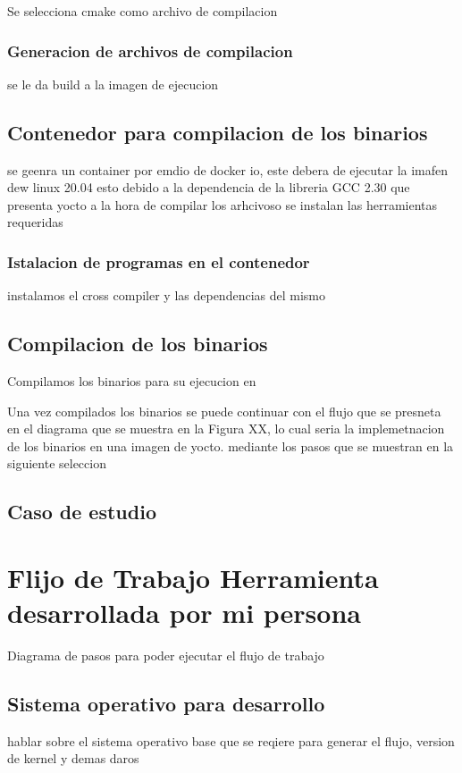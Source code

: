 Se selecciona cmake como archivo de compilacion 

\subsubsection{Generacion de archivos de compilacion}

se le da build a la imagen de ejecucion

\subsection{Contenedor para compilacion de los binarios}

se geenra un container por emdio de docker io, este debera de ejecutar la imafen dew linux 20.04 esto debido a la dependencia de la libreria GCC 2.30 que presenta yocto a la hora de compilar los arhcivoso
se instalan las herramientas requeridas

\subsubsection{Istalacion de programas en el contenedor}

instalamos el cross compiler y las dependencias del mismo

\subsection{Compilacion de los binarios}

Compilamos los binarios para su ejecucion en

Una vez compilados los binarios se puede continuar con el flujo que se presneta en el diagrama que se muestra en la Figura XX, lo cual seria la implemetnacion de los binarios en una imagen de yocto. mediante los pasos que se muestran en la siguiente seleccion


\subsection{Caso de estudio}


\section{Flijo de Trabajo Herramienta desarrollada por mi persona}
Diagrama de pasos para poder ejecutar el flujo de trabajo

\subsection{Sistema operativo para desarrollo}
hablar sobre el sistema operativo base que se reqiere para generar el flujo, version de kernel y demas daros 

